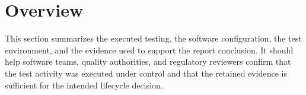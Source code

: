 \section{Overview}
This section summarizes the executed testing, the software configuration, the
test environment, and the evidence used to support the report conclusion.  It
should help software teams, quality authorities, and regulatory reviewers confirm
that the test activity was executed under control and that the retained evidence
is sufficient for the intended lifecycle decision.
